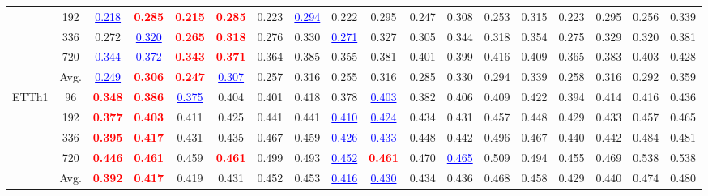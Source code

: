 \begin{table}[t]
{\begin{tabular}{cc|cc|cc|cc|cc|cc|cc|cc|cc}
 & 192 & \textcolor{blue}{\underline{0.218}} & \textcolor{red}{\textbf{0.285}} & \textcolor{red}{\textbf{0.215}} & \textcolor{red}{\textbf{0.285}} & 0.223 & \textcolor{blue}{\underline{0.294}} & 0.222 & 0.295 & 0.247 & 0.308 & 0.253 & 0.315 & 0.223 & 0.295 & 0.256 & 0.339 \\
 & 336 & 0.272 & \textcolor{blue}{\underline{0.320}} & \textcolor{red}{\textbf{0.265}} & \textcolor{red}{\textbf{0.318}} & 0.276 & 0.330 & \textcolor{blue}{\underline{0.271}} & 0.327 & 0.305 & 0.344 & 0.318 & 0.354 & 0.275 & 0.329 & 0.320 & 0.381 \\
 & 720 & \textcolor{blue}{\underline{0.344}} & \textcolor{blue}{\underline{0.372}} & \textcolor{red}{\textbf{0.343}} & \textcolor{red}{\textbf{0.371}} & 0.364 & 0.385 & 0.355 & 0.381 & 0.401 & 0.399 & 0.416 & 0.409 & 0.365 & 0.383 & 0.403 & 0.428 \\
\cmidrule(lr){2-18}
 & Avg. & \textcolor{blue}{\underline{0.249}} & \textcolor{red}{\textbf{0.306}} & \textcolor{red}{\textbf{0.247}} & \textcolor{blue}{\underline{0.307}} & 0.257 & 0.316 & 0.255 & 0.316 & 0.285 & 0.330 & 0.294 & 0.339 & 0.258 & 0.316 & 0.292 & 0.359 \\
\midrule
\multirow{5}{*}{ETTh1} & 96 & \textcolor{red}{\textbf{0.348}} & \textcolor{red}{\textbf{0.386}} & \textcolor{blue}{\underline{0.375}} & 0.404 & 0.401 & 0.418 & 0.378 & \textcolor{blue}{\underline{0.403}} & 0.382 & 0.406 & 0.409 & 0.422 & 0.394 & 0.414 & 0.416 & 0.436 \\
 & 192 & \textcolor{red}{\textbf{0.377}} & \textcolor{red}{\textbf{0.403}} & 0.411 & 0.425 & 0.441 & 0.441 & \textcolor{blue}{\underline{0.410}} & \textcolor{blue}{\underline{0.424}} & 0.434 & 0.431 & 0.457 & 0.448 & 0.429 & 0.433 & 0.457 & 0.465 \\
 & 336 & \textcolor{red}{\textbf{0.395}} & \textcolor{red}{\textbf{0.417}} & 0.431 & 0.435 & 0.467 & 0.459 & \textcolor{blue}{\underline{0.426}} & \textcolor{blue}{\underline{0.433}} & 0.448 & 0.442 & 0.496 & 0.467 & 0.440 & 0.442 & 0.484 & 0.481 \\
 & 720 & \textcolor{red}{\textbf{0.446}} & \textcolor{red}{\textbf{0.461}} & 0.459 & \textcolor{red}{\textbf{0.461}} & 0.499 & 0.493 & \textcolor{blue}{\underline{0.452}} & \textcolor{red}{\textbf{0.461}} & 0.470 & \textcolor{blue}{\underline{0.465}} & 0.509 & 0.494 & 0.455 & 0.469 & 0.538 & 0.538 \\
\cmidrule(lr){2-18}
 & Avg. & \textcolor{red}{\textbf{0.392}} & \textcolor{red}{\textbf{0.417}} & 0.419 & 0.431 & 0.452 & 0.453 & \textcolor{blue}{\underline{0.416}} & \textcolor{blue}{\underline{0.430}} & 0.434 & 0.436 & 0.468 & 0.458 & 0.429 & 0.440 & 0.474 & 0.480 \\

\end{tabular}}
\end{table}
